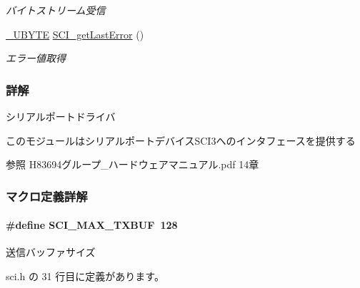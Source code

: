 \begin{DoxyCompactItemize}
\begin{DoxyCompactList}\small\item\em バイトストリーム受信 \end{DoxyCompactList}\item 
\hyperlink{stddef_8h_aac464b47452ce9406f88ef194e2becc1_aac464b47452ce9406f88ef194e2becc1}{\+\_\+\+U\+B\+Y\+T\+E} \hyperlink{sci_8h_a31c5c3fad1871cd4940561cd57610d00_a31c5c3fad1871cd4940561cd57610d00}{S\+C\+I\+\_\+get\+Last\+Error} ()
\begin{DoxyCompactList}\small\item\em エラー値取得 \end{DoxyCompactList}\end{DoxyCompactItemize}


\subsubsection{詳解}
シリアルポートドライバ 

このモジュールはシリアルポートデバイス\+S\+C\+I3へのインタフェースを提供する

\begin{DoxySeeAlso}{参照}
H83694グループ\+\_\+ハードウェアマニュアル.\+pdf 14章
\end{DoxySeeAlso}
 

\subsubsection{マクロ定義詳解}
\paragraph[{S\+C\+I\+\_\+\+M\+A\+X\+\_\+\+T\+X\+B\+U\+F}]{\setlength{\rightskip}{0pt plus 5cm}\#define S\+C\+I\+\_\+\+M\+A\+X\+\_\+\+T\+X\+B\+U\+F~128}\label{sci_8h_a3215a6d64ad06026d58b5f2a823def50_a3215a6d64ad06026d58b5f2a823def50}


送信バッファサイズ 



 sci.\+h の 31 行目に定義があります。

